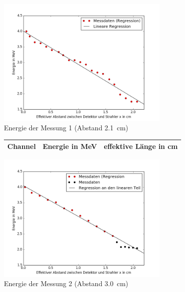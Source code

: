  
  \begin{figure}[h!]
  	\centering
  	\includegraphics[width=0.75\textwidth]{build/energie1.png}
  	\caption{Energie der Messung 1 (Abstand \SI{2,1}{\centi\meter})}
  	\label{fig:energie1}
  \end{figure}
  
  \clearpage
  
  
    \begin{figure}[h!]
    	\centering
    	\begin{tabular}{c|c|c}
    		Channel & Energie in \si{\mega\electronvolt} & effektive Länge in \si{cm} \\
    		\hline
    		
    	\end{tabular}
    	\label{tab:energie2}
    \end{figure}
    
   \begin{figure}[h!]
   	\centering
   	\includegraphics[width=0.75\textwidth]{build/energie2.png}
   	\caption{Energie der Messung 2 (Abstand \SI{3,0}{\centi\meter})}
   	\label{fig:energie2}
   \end{figure}
   
